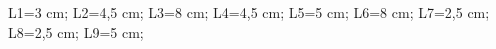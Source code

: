 \documentclass[exercice]{thedocument}%
\begin{document}
%
\>L1=3 cm;%
\>L2=4,5 cm;%
\>L3=8 cm;%
\>L4=4,5 cm;%
\>L5=5 cm;%
\>L6=8 cm;%
\>L7=2,5 cm;%
\>L8=2,5 cm;%
\>L9=5 cm;%
%
\end{document}
